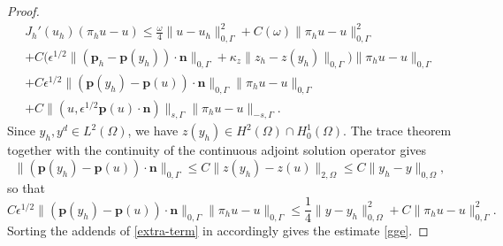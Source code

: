 \documentclass[a4paper,10pt]{article}
\newcommand{\bp}{{\mathbf{p}}}
\newcommand{\bn}{{\mathbf{n}}}
\numberwithin{theorem}{section}
\begin{document}
\begin{proof}
\begin{multline}
J_h'(u_h)(\pi_h u - u) \le \frac{\omega}{4}\|u-u_h\|_{0,\Gamma}^2+C(\omega) \|\pi_hu-u\|_{0,\Gamma}^2  \\ +C \big(\epsilon^{1/2}\|(\bp_h - \bp(y_h))\cdot\bn\|_{0,\Gamma}+\kappa_z\|z_h - z(y_h)\|_{0,\Gamma}\big)\|\pi_hu-u\|_{0,\Gamma}  \\ + C\epsilon^{1/2}\|(\bp(y_h)-\bp(u))\cdot\bn\|_{0,\Gamma}\|\pi_hu-u\|_{0,\Gamma}  \\ + C\|(u,\epsilon^{1/2}\bp(u)\cdot\bn)\|_{s,\Gamma}\|\pi_hu-u\|_{-s,\Gamma}.
\end{multline}
Since $y_h, y^d\in L^2(\Omega)$, we have 
$z(y_h) \in H^2(\Omega) \cap H_0^1(\Omega)$. The trace theorem together with the continuity of the continuous adjoint solution operator gives 
\begin{equation}\label{eqn:f7}
\|(\bp(y_h) - \bp(u))\cdot\bn\|_{0,\Gamma}\leq  C \|z(y_h) - z(u)\|_{2,\Omega}  \leq C \|y_h - y \|_{0,\Omega},
\end{equation}
so that
\[C \epsilon^{1/2}\|(\bp(y_h) - \bp(u))\cdot\bn\|_{0,\Gamma}\|\pi_hu-u\|_{0,\Gamma} \le \frac{1}{4}\|y-y_h\|_{0,\Omega}^2 + C\|\pi_hu-u\|_{0,\Gamma}^2.\]
Sorting the addends of \eqref{extra-term} in accordingly gives the estimate \eqref{gge}.
\end{proof}
%
\end{document}
